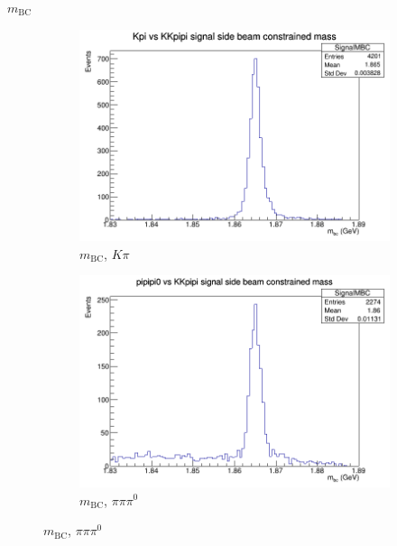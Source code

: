 \documentclass{beamer}
\begin{document}
\begin{frame}{$m_\text{BC}$}
  \begin{figure}
    \centering
    \begin{subfigure}{0.5\textwidth}
      \centering
      \includegraphics[width=\textwidth]{KpiSignalMBC.png}
      \caption{$m_\text{BC}$, $K\pi$}
    \end{subfigure}%
    \begin{subfigure}{0.5\textwidth}
      \centering
      \includegraphics[width=\textwidth]{pipipi0SignalMBC.png}
      \caption{$m_\text{BC}$, $\pi\pi\pi^0$}
    \end{subfigure}
  \end{figure}
\end{frame}
\end{document}
